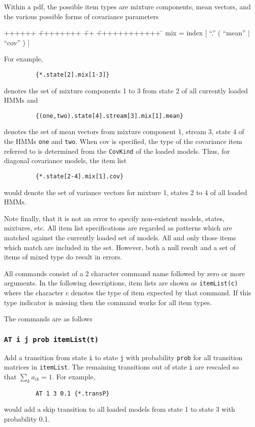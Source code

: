 Within a pdf, the possible item types are mixture components,
mean vectors, and the various possible forms of covariance
parameters
{\sf
\begin{tabbing}
++++++ \= ++++++++ \= ++ \= ++++++++++++ \=  \kill
\>   mix \>  = \>  index [ ``.'' ( ``mean'' $|$ ``cov'' ) ]
\end{tabbing}}
For example,
\begin{verbatim}
         {*.state[2].mix[1-3]}
\end{verbatim}
denotes the set of mixture components 1 to 3 from state 2 of all
currently loaded HMMs and
\begin{verbatim}
         {(one,two).state[4].stream[3].mix[1].mean}
\end{verbatim}
denotes the set of mean vectors from mixture component 1, stream 3,
state 4 of the HMMs \texttt{one} and \texttt{two}.  When {\sf cov}
is specified, the type of the covariance item referred to is 
determined from the \texttt{CovKind} of the loaded models.  Thus,
for diagonal covariance models, the item list
\begin{verbatim}
         {*.state[2-4].mix[1].cov}
\end{verbatim}
would denote the set of variance vectors for mixture 1, states 2 to 4
of all loaded HMMs.

Note finally, that it is not an error to specify non-existent models,
states, mixtures, etc.  All item list specifications are regarded
as patterns which are matched against the currently loaded set of
models.  All and only those items which match are included in
the set.  However, both a null result and a set of items of mixed
type do result in errors.

All  commands consist of a 2 character command name followed
by zero or more arguments.  In the following descriptions, item
lists are shown as \texttt{itemList(c)} where the character c denotes the
type of item expected by that command.  If this type indicator is
missing then the command works for all item types.

The  commands are as follows

\subsubsection{\texttt{AT i j prob itemList(t)}}

Add a transition from state \texttt{i} to state \texttt{j} with probability
\texttt{prob} for all transition matrices in \texttt{itemList}.  The remaining
transitions out of state \texttt{i} are rescaled so that $\sum_k a_{ik} = 1 $.
For example,
\begin{verbatim}
         AT 1 3 0.1 {*.transP}
\end{verbatim}
would add a skip transition to all loaded models from state 1 to state 3
with probability 0.1.

